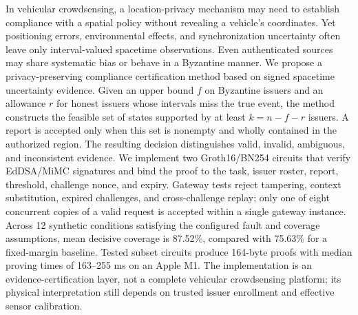 In vehicular crowdsensing, a location-privacy mechanism may need to establish compliance with a spatial policy without revealing a vehicle's coordinates. Yet positioning errors, environmental effects, and synchronization uncertainty often leave only interval-valued spacetime observations. Even authenticated sources may share systematic bias or behave in a Byzantine manner. We propose a privacy-preserving compliance certification method based on signed spacetime uncertainty evidence. Given an upper bound $f$ on Byzantine issuers and an allowance $r$ for honest issuers whose intervals miss the true event, the method constructs the feasible set of states supported by at least $k=n-f-r$ issuers. A report is accepted only when this set is nonempty and wholly contained in the authorized region. The resulting decision distinguishes valid, invalid, ambiguous, and inconsistent evidence. We implement two Groth16/BN254 circuits that verify EdDSA/MiMC signatures and bind the proof to the task, issuer roster, report, threshold, challenge nonce, and expiry. Gateway tests reject tampering, context substitution, expired challenges, and cross-challenge replay; only one of eight concurrent copies of a valid request is accepted within a single gateway instance. Across 12 synthetic conditions satisfying the configured fault and coverage assumptions, mean decisive coverage is 87.52\%, compared with 75.63\% for a fixed-margin baseline. Tested subset circuits produce 164-byte proofs with median proving times of 163--255 ms on an Apple M1. The implementation is an evidence-certification layer, not a complete vehicular crowdsensing platform; its physical interpretation still depends on trusted issuer enrollment and effective sensor calibration.